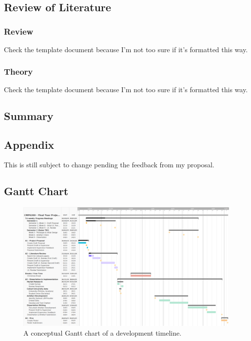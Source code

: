 \documentclass[12pt]{report}
\begin{document}
    \section{Review of Literature}

    \subsection{Review}

    Check the template document because I'm not too sure if it's formatted this way.

    \subsection{Theory}

    Check the template document because I'm not too sure if it's formatted this way.
    
    \section{Summary}

    
    \begin{landscape}

    \chapter{Appendix}
    
    \begin{tcolorbox}[colback=red!5!white,colframe=red!75!black,title=Copied from proposal]
        This is still subject to change pending the feedback from my proposal.
    \end{tcolorbox}

    \section{Gantt Chart}



    \begin{figure}[H]
        \centering
        \includegraphics[width=.75\linewidth]{ProposalGantt.png}
        \caption{A conceptual Gantt chart of a development timeline.}
        \label{fig:gantt}
    \end{figure}

    \end{landscape}
\end{document}
